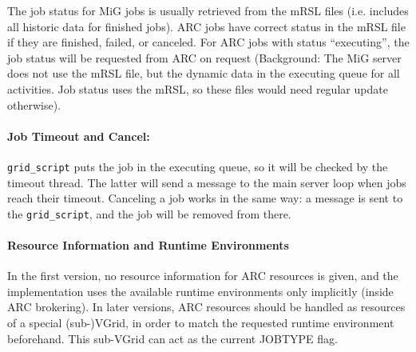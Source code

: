 \documentclass[11pt]{article}
\begin{document}
 The job status for MiG jobs is usually retrieved from the mRSL files
 (i.e. includes all historic data for finished jobs). ARC jobs have
 correct status in the mRSL file if they are finished, failed, or
 canceled. For ARC jobs with status ``executing'', the job status will
 be requested from ARC on request (Background: The MiG server does not
 use the mRSL file, but the dynamic data in the executing queue for
 all activities. Job status uses the mRSL, so these files would need
 regular update otherwise).

\paragraph{Job Timeout and Cancel:}
 \verb!grid_script! puts the job in the executing queue, so it will be
 checked by the timeout thread. The latter will send a message to the
 main server loop when jobs reach their timeout. Canceling a job
 works in the same way: a message is sent to the \verb!grid_script!,
 and the job will be removed from there.
 
\paragraph{Resource Information and Runtime Environments}

In the first version, no resource information for ARC resources is
given, and the implementation uses the available runtime environments
only implicitly (inside ARC brokering). In later versions, ARC
resources should be handled as resources of a special (sub-)VGrid, in
order to match the requested runtime environment beforehand. This
sub-VGrid can act as the current JOBTYPE flag.
\end{document}
